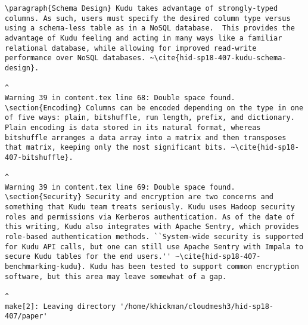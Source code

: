 \begin{tiny}
\begin{verbatim}
\paragraph{Schema Design} Kudu takes advantage of strongly-typed columns. As such, users must specify the desired column type versus using a schema-less table as in a NoSQL database.  This provides the advantage of Kudu feeling and acting in many ways like a familiar relational database, while allowing for improved read-write performance over NoSQL databases. ~\cite{hid-sp18-407-kudu-schema-design}.  
                                                                                                                                                                                                                                                                                                                                                                         ^
Warning 39 in content.tex line 68: Double space found.
\section{Encoding} Columns can be encoded depending on the type in one of five ways: plain, bitshuffle, run length, prefix, and dictionary. Plain encoding is data stored in its natural format, whereas bitshuffle arranges a data array into a matrix and then transposes that matrix, keeping only the most significant bits. ~\cite{hid-sp18-407-bitshuffle}.  
                                                                                                                                                                                                                                                                                                                                ^
Warning 39 in content.tex line 69: Double space found.
\section{Security} Security and encryption are two concerns and something that Kudu team treats seriously. Kudu uses Hadoop security roles and permissions via Kerberos authentication. As of the date of this writing, Kudu also integrates with Apache Sentry, which provides role-based authentication methods. ``System-wide security is supported for Kudu API calls, but one can still use Apache Sentry with Impala to secure Kudu tables for the end users.'' ~\cite{hid-sp18-407-benchmarking-kudu}. Kudu has been tested to support common encryption software, but this area may leave somewhat of a gap.  
                                                                                                                                                                                                                                                                                                                                                                                                                                                                     ^
make[2]: Leaving directory '/home/khickman/cloudmesh3/hid-sp18-407/paper'
\end{verbatim}
\end{tiny}
